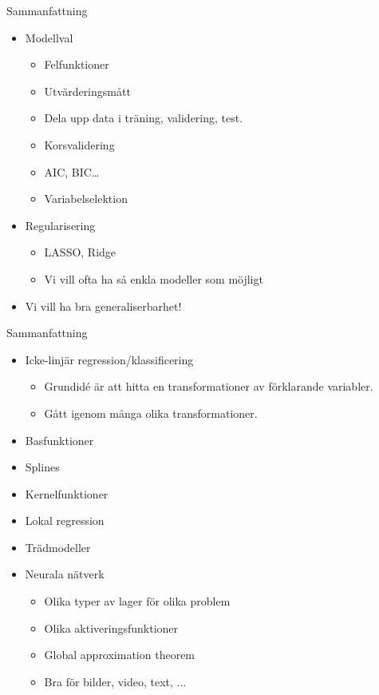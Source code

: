 \documentclass[10pt,english]{beamer}
\begin{document}
\begin{frame}{Sammanfattning}
    \begin{itemize}
        \item Modellval
        \begin{itemize}
            \item Felfunktioner
            \item Utvärderingsmått
            \item Dela upp data i träning, validering, test.
            \item Korsvalidering
            \item AIC, BIC\dots
            \item Variabelselektion
        \end{itemize}
        \item Regularisering
        \begin{itemize}
            \item LASSO, Ridge
            \item Vi vill ofta ha så enkla modeller som möjligt
        \end{itemize}
        \item Vi vill ha bra generaliserbarhet!
    \end{itemize}
\end{frame}

\begin{frame}{Sammanfattning}
    
    \begin{itemize}
        \item Icke-linjär regression/klassificering
        \begin{itemize}
            \item Grundidé är att hitta en transformationer av förklarande variabler.
            \item Gått igenom många olika transformationer.
        \end{itemize}
        \item Basfunktioner
        \item Splines
        \item Kernelfunktioner
        \item Lokal regression
        \item Trädmodeller
        \item Neurala nätverk
        \begin{itemize}
            \item Olika typer av lager för olika problem
            \item Olika aktiveringsfunktioner
            \item Global approximation theorem
            \item Bra för bilder, video, text, ...
        \end{itemize}
    \end{itemize}

\end{frame}
\end{document}
